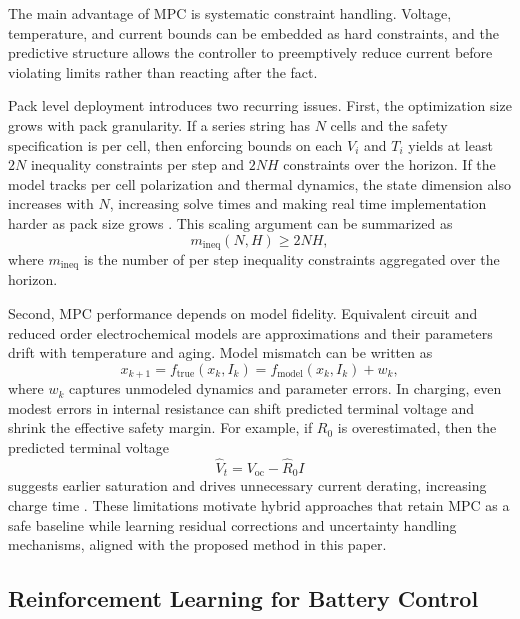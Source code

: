 \documentclass[%
 aip,
 amsmath,amssymb,
reprint, onecolumn %
]{revtex4-1}
\begin{document}
The main advantage of MPC is systematic constraint handling. Voltage, temperature, and current bounds can be embedded as hard constraints, and the predictive structure allows the controller to preemptively reduce current before violating limits rather than reacting after the fact.

Pack level deployment introduces two recurring issues. First, the optimization size grows with pack granularity. If a series string has $N$ cells and the safety specification is per cell, then enforcing bounds on each $V_i$ and $T_i$ yields at least $2N$ inequality constraints per step and $2NH$ constraints over the horizon. If the model tracks per cell polarization and thermal dynamics, the state dimension also increases with $N$, increasing solve times and making real time implementation harder as pack size grows \cite{pinter2025reconfigurable,krewer2018review}. This scaling argument can be summarized as
\begin{equation}
m_{\mathrm{ineq}}(N,H) \ge 2NH,
\end{equation}
where $m_{\mathrm{ineq}}$ is the number of per step inequality constraints aggregated over the horizon.

Second, MPC performance depends on model fidelity. Equivalent circuit and reduced order electrochemical models are approximations and their parameters drift with temperature and aging. Model mismatch can be written as
\begin{equation}
x_{k+1} = f_{\mathrm{true}}(x_k, I_k) = f_{\mathrm{model}}(x_k, I_k) + w_k,
\end{equation}
where $w_k$ captures unmodeled dynamics and parameter errors. In charging, even modest errors in internal resistance can shift predicted terminal voltage and shrink the effective safety margin. For example, if $R_0$ is overestimated, then the predicted terminal voltage
\begin{equation}
\widehat{V}_t = V_{\mathrm{oc}} - \widehat{R}_0 I
\end{equation}
suggests earlier saturation and drives unnecessary current derating, increasing charge time \cite{liu2018charging,krewer2018review}. These limitations motivate hybrid approaches that retain MPC as a safe baseline while learning residual corrections and uncertainty handling mechanisms, aligned with the proposed method in this paper.

\subsection{Reinforcement Learning for Battery Control}
\end{document}
